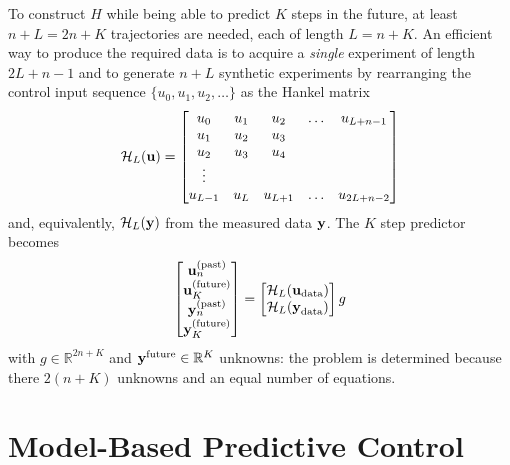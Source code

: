 To construct $H$ while being able to predict $K$ steps in the future, at least $n+L=2n+K$ trajectories are needed, each of length $L=n+K$. An efficient way to produce the required data is to acquire a \emph{single} experiment of length $2L+n-1$ and to generate $n+L$ synthetic experiments by rearranging the control input sequence $\{u_0, u_1, u_2,\ldots\}$ as the Hankel matrix
\begin{equation*}
  \mathcal{H}_L(\boldsymbol{\mathrm{u}}) =
  \begin{bmatrix}
    u_0 & u_1 & u_2 & \ldots & u_{L+n-1} \\
    u_1 & u_2 & u_3  \\
    u_2 & u_3 & u_4 \\
    \vdots \\
    u_{L-1} & u_L & u_{L+1} & \ldots & u_{2L+n-2}
  \end{bmatrix}
\end{equation*}
and, equivalently, $\mathcal{H}_L(\boldsymbol{\mathrm{y}})$ from the measured data $\boldsymbol{\mathrm{y}}$. The $K$ step predictor becomes
\begin{equation*}
  \label{eq:deepc-K-steps-predictor-H}
  \begin{bmatrix}
    \boldsymbol{\mathrm{u}}_n^{(\textrm{past})} \\ \boldsymbol{\mathrm{u}}_K^{(\textrm{future})} \\ \boldsymbol{\mathrm{y}}_n^{(\textrm{past})} \\ \boldsymbol{\mathrm{y}}_K^{(\textrm{future})}
  \end{bmatrix} =
  \begin{bmatrix}
    \mathcal{H}_L(\boldsymbol{\mathrm{u}}_\textrm{data}) \\ \mathcal{H}_L(\boldsymbol{\mathrm{y}}_\textrm{data})
  \end{bmatrix} g
\end{equation*}
with $g\in \mathbb{R}^{2n+K}$ and $\boldsymbol{\mathrm{y}}^\textrm{future}\in\mathbb{R}^K$ unknowns: the problem is determined because there $2(n+K)$ unknowns and an equal number of equations.


\section{Model-Based Predictive Control}
\label{sec:model-based-predictive-control}

